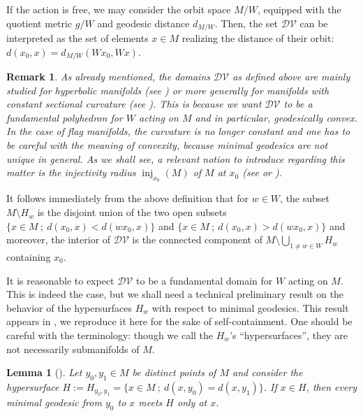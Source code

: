 \documentclass[11pt,twoside]{amsart}
\theoremstyle{plain}
\newtheorem{lem}[prop]{Lemma}
\newtheorem{rem}[prop]{Remark}
\DeclareMathOperator\inj{inj}
\begin{document}
If the action is free, we may consider the orbit space $M/W$, equipped with the quotient metric $g/W$ and geodesic distance $d_{M/W}$. Then, the set $\mathcal{DV}$ can be interpreted as the set of elements $x\in M$ realizing the distance of their orbit: $d(x_0,x)=d_{M/W}(Wx_0,Wx)$.

\begin{rem}\label{care_with_convexity}
As already mentioned, the domains $\mathcal{DV}$ as defined above are mainly studied for hyperbolic manifolds (see \cite{bowditch_hyperbolic}) or more generally for manifolds with constant sectional curvature (see \cite[\S 6.6]{ratcliffe_hyperbolic}). This is because we want $\mathcal{DV}$ to be a \emph{fundamental polyhedron} for $W$ acting on $M$ and in particular, geodesically convex. In the case of flag manifolds, the curvature is no longer constant and one has to be careful with the meaning of convexity, because minimal geodesics are not unique in general. As we shall see, a relevant notion to introduce regarding this matter is the \emph{injectivity radius} $\inj_{x_0}(M)$ of $M$ at $x_0$ (see \cite[\S 6.2]{lee_riema} or \cite[Definition 2.116]{gallot-hulin-lafontaine}).
\end{rem}

It follows immediately from the above definition that for $w\in W$, the subset $M\setminus H_w$ is the disjoint union of the two open subsets $\{x\in M~;~d(x_0,x)<d(wx_0,x)\}$ and $\{x\in M~;~d(x_0,x)>d(wx_0,x)\}$ and moreover, the interior of $\mathcal{DV}$ is the connected component of $M\setminus \bigcup_{1\ne w\in W}H_w$ containing $x_0$.

It is reasonable to expect $\mathcal{DV}$ to be a fundamental domain for $W$ acting on $M$. This is indeed the case, but we shall need a technical preliminary result on the behavior of the hypersurfaces $H_w$ with respect to minimal geodesics. This result appears in \cite{reflection_groups_on_manifolds}, we reproduce it here for the sake of self-containment. One should be careful with the terminology: though we call the $H_w$'s ``hypersurfaces'', they are not necessarily submanifolds of $M$.

\begin{lem}[\emph{\cite[Lemma 2.2]{reflection_groups_on_manifolds}}]\label{interonlyonce}
Let $y_0,y_1\in M$ be distinct points of $M$ and consider the hypersurface $H:=H_{y_0,y_1}=\{x\in M~;~d(x,y_0)=d(x,y_1)\}$. If $x\in H$, then every minimal geodesic from $y_0$ to $x$ meets $H$ only at $x$.
\end{lem}
\end{document}
